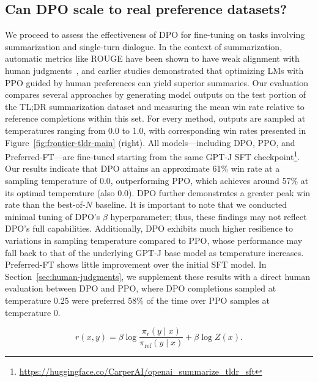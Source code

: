 \subsection{Can DPO scale to real preference datasets?}
\label{sec:dpo-real-datasets}
We proceed to assess the effectiveness of DPO for fine-tuning on tasks involving summarization and single-turn dialogue. In the context of summarization, automatic metrics like ROUGE have been shown to have weak alignment with human judgments~\citep{stiennon2022learning}, and earlier studies demonstrated that optimizing LMs with PPO guided by human preferences can yield superior summaries. Our evaluation compares several approaches by generating model outputs on the test portion of the TL;DR summarization dataset and measuring the mean win rate relative to reference completions within this set. For every method, outputs are sampled at temperatures ranging from 0.0 to 1.0, with corresponding win rates presented in Figure~\ref{fig:frontier-tldr-main} (right). All models—including DPO, PPO, and Preferred-FT—are fine-tuned starting from the same GPT-J SFT checkpoint\footnote{\url{https://huggingface.co/CarperAI/openai_summarize_tldr_sft}}. Our results indicate that DPO attains an approximate 61\% win rate at a sampling temperature of 0.0, outperforming PPO, which achieves around 57\% at its optimal temperature (also 0.0). DPO further demonstrates a greater peak win rate than the best-of-$N$ baseline. It is important to note that we conducted minimal tuning of DPO's $\beta$ hyperparameter; thus, these findings may not reflect DPO’s full capabilities. Additionally, DPO exhibits much higher resilience to variations in sampling temperature compared to PPO, whose performance may fall back to that of the underlying GPT-J base model as temperature increases. Preferred-FT shows little improvement over the initial SFT model. In Section~\ref{sec:human-judgments}, we supplement these results with a direct human evaluation between DPO and PPO, where DPO completions sampled at temperature 0.25 were preferred 58\% of the time over PPO samples at temperature 0.

\begin{equation}\label{eq:main_eq}
    r(x,y) =\beta \log \frac{\pi_r(y\mid x)}{\pi_\text{ref}(y\mid x)} + \beta \log Z(x).
\end{equation}

